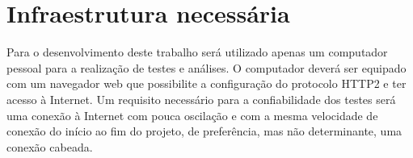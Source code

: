 %
%

\chapter{Infraestrutura necessária}

Para o desenvolvimento deste trabalho será utilizado apenas um computador pessoal para a realização de testes e análises. O computador deverá ser equipado com um navegador web que possibilite a configuração do protocolo HTTP2 e ter acesso à Internet. Um requisito necessário para a confiabilidade dos testes será uma conexão à Internet com pouca oscilação e com a mesma velocidade de conexão do início ao fim do projeto, de preferência, mas não determinante, uma conexão cabeada.